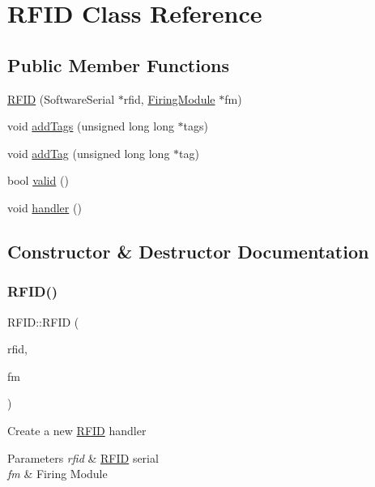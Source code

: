 \hypertarget{class_r_f_i_d}{}\section{R\+F\+ID Class Reference}
\label{class_r_f_i_d}
\subsection*{Public Member Functions}
\begin{DoxyCompactItemize}
\item 
\hyperlink{class_r_f_i_d_a2b809351a1750216c755605a99a751f0}{R\+F\+ID} (Software\+Serial $\ast$rfid, \hyperlink{class_firing_module}{Firing\+Module} $\ast$fm)
\item 
void \hyperlink{class_r_f_i_d_a8b8f9db1b91701eaa744f5e39d93b55f}{add\+Tags} (unsigned long long $\ast$tags)
\item 
void \hyperlink{class_r_f_i_d_a0eee010e53dfae9c13cda31ae8cb8a13}{add\+Tag} (unsigned long long $\ast$tag)
\item 
bool \hyperlink{class_r_f_i_d_aba5b7775ad04dfec3524a82520d4e8e5}{valid} ()
\item 
void \hyperlink{class_r_f_i_d_aad926c48b528a510b4d34c4019632e09}{handler} ()
\end{DoxyCompactItemize}


\subsection{Constructor \& Destructor Documentation}
\mbox{\label{class_r_f_i_d_a2b809351a1750216c755605a99a751f0}} 
\subsubsection{\texorpdfstring{R\+F\+I\+D()}{RFID()}}
{\footnotesize\ttfamily R\+F\+I\+D\+::\+R\+F\+ID (\begin{DoxyParamCaption}\item[{Software\+Serial $\ast$}]{rfid,  }\item[{\hyperlink{class_firing_module}{Firing\+Module} $\ast$}]{fm }\end{DoxyParamCaption})}

Create a new \hyperlink{class_r_f_i_d}{R\+F\+ID} handler 
\begin{DoxyParams}{Parameters}
{\em rfid} & \hyperlink{class_r_f_i_d}{R\+F\+ID} serial \\
\hline
{\em fm} & Firing Module \\
\hline
\end{DoxyParams}


